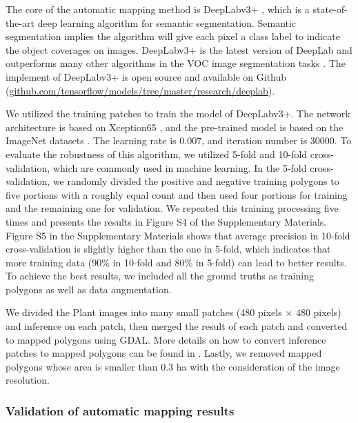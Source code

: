 \documentclass[preprint,12pt,authoryear]{elsarticle}
\begin{document}
The core of the automatic mapping method is DeepLabv3+ \citep{chen_encoder-decoder_2018} , which is a state-of-the-art deep learning algorithm for semantic segmentation. Semantic segmentation implies the algorithm will give each pixel a class label to indicate the object coverages on images. DeepLabv3+ is the latest version of DeepLab and outperforms many other algorithms in the VOC image segmentation tasks \citep{everingham_pascal_2015}. The implement of DeepLabv3+ is open source and available on Github (\url{github.com/tensorflow/models/tree/master/research/deeplab}).

We utilized the training patches to train the model of DeepLabv3+. The network architecture is based on Xception65 \citep{chollet2017xception}, and the pre-trained model is based on the ImageNet datasets \citep{russakovsky2015imagenet}. The learning rate is 0.007, and iteration number is 30000. To evaluate the robustness of this algorithm, we utilized 5-fold and 10-fold cross-validation, which are commonly used in machine learning. In the 5-fold cross-validation, we randomly divided the positive and negative training polygons to five portions with a roughly equal count and then used four portions for training and the remaining one for validation. We repeated this training processing five times and presents the results in Figure S4 of the Supplementary Materials. Figure S5 in the Supplementary Materials shows that average precision in 10-fold cross-validation is slightly higher than the one in 5-fold, which indicates that more training data (90\% in 10-fold and 80\% in 5-fold) can lead to better results. To achieve the best results, we included all the ground truths as training polygons as well as data augmentation. 

We divided the Plant images into many small patches (480 pixels $\times$  480 pixels) and inference on each patch, then merged the result of each patch and converted to mapped polygons using GDAL. More details on how to convert inference patches to mapped polygons can be found in \cite{huang2018automatic}. Lastly, we removed mapped polygons whose area is smaller than 0.3 ha with the consideration of the image resolution.  

\subsubsection{Validation of automatic mapping results}
\label{subsubsec_validation}
\end{document}
